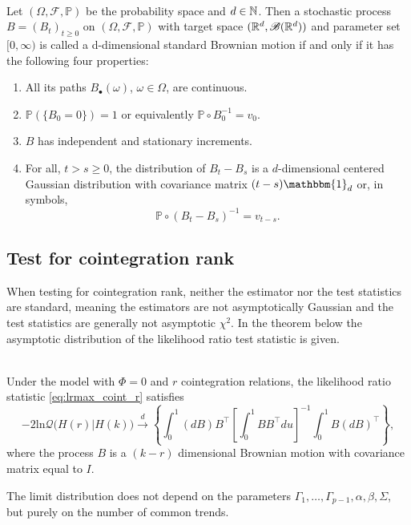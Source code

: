 \begin{defi}\phantom{}\\
    Let $(\Omega, \mathscr{F}, \mathbb{P})$ be the probability space and $d\in \mathbb{N}$. Then a stochastic process $B=(B_t)_{t\geq0}$ on $(\Omega, \mathscr{F}, \mathbb{P})$ with target space $(\mathbb{R}^d,\mathscr{B}(\mathbb{R}^d))$ and parameter set $[0,\infty)$ is called a d-dimensional standard Brownian motion if and only if it has the following four properties:
    

\begin{enumerate}
     \item All its paths $B_\bullet(\omega)$, $\omega\in\Omega$, are continuous.
     \item $\mathbb{P}(\{B_0=0\})=1$ or equivalently $\mathbb{P}\circ B_0^{-1}=v_0$.
     \item $B$ has independent and stationary increments.        
     \item  For all, $t > s \geq 0 $, the distribution of $B_t-B_s$ is a $d$-dimensional centered Gaussian distribution with covariance matrix $(t-s) \mathbbm{1}_d$ or, in symbols, 
     \begin{equation*}
         \mathbb{P}\circ (B_t-B_s)^{-1}=v_{t-s}.
     \end{equation*}
\end{enumerate}
\end{defi}


\subsection{Test for cointegration rank}
When testing for cointegration rank, neither the estimator nor the test statistics are standard, meaning the estimators are not asymptotically Gaussian and the test statistics are generally not asymptotic $\chi^2$. In the theorem below the asymptotic distribution of the likelihood ratio test statistic is given.

\begin{thm}\phantom\\
    Under the model with $\Phi=0$ and $r$ cointegration relations, the likelihood ratio statistic \eqref{eq:lrmax_coint_r} satisfies
    \begin{equation*}
        -2 \text{ln}\mathcal{Q} \big( H(r)|H(k) \big) \overset{d}{\rightarrow} \left\{ \int_0^1 (dB)B^{\top} \left[\int_0^1 BB^\top du \right]^{-1} \int_0^1 B(dB)^\top \right\},
    \end{equation*}
    where the process $B$ is a $(k-r)$ dimensional Brownian motion with covariance matrix equal to $I.$
    \label{thm:asymptotic_distribution}
\end{thm}
\noindent The limit distribution does not depend on the parameters $\Gamma_1,\ldots,\Gamma_{p-1},\alpha,\beta,\Sigma$, but purely on the number of common trends.

